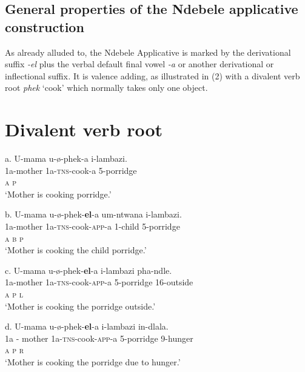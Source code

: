 \documentclass[output=paper]{langsci/langscibook}
\begin{document}
\section{ General properties of the Ndebele applicative construction}

As already alluded to, the Ndebele Applicative is marked by the derivational suffix \textit{{}-el }plus the verbal default final vowel \textit{{}-a} or another derivational or inflectional suffix\textit{.} It is valence adding, as illustrated in (2) with a divalent verb root \textit{phek} ‘cook’ which normally takes only one object. 

\chapter[Divalent verb root ]{Divalent verb root\textbf{ }}
\gll   a.  U-mama         u-ø-phek-a             i-lambazi.\\
     \textit{    }1a-mother      1a-\textsc{tns}{}-cook-a      5-porridge\\
         \textsc{a                  p}\\
\glt     ‘Mother is cooking porridge.’
\z

\gll   b.   U-mama        u-ø-phek-\textbf{el}{}-a          um-ntwana  i-lambazi. \\
     \textit{    }1a-mother      1a-\textsc{tns}{}-cook-\textsc{app}{}-a  1-child      5-porridge\\
     \textit{    }\textsc{a                  b        p}\\
\glt     ‘Mother is cooking the child porridge.’
\z

\gll   c.  U-mama      u-ø-phek-\textbf{el}{}-a              i-lambazi        pha-ndle.\\
         1a-mother   1a-\textsc{tns}{}-cook-\textsc{app}{}-a    5-porridge       16-outside\\
         \textsc{a                    p        l}\\
\glt     ‘Mother is cooking the porridge outside.’
\z

\gll   d.  U-mama          u-ø-phek-\textbf{el}{}-a               i-lambazi    in-dlala.\\
         1a - mother     1a-\textsc{tns}{}-cook-\textsc{app}{}-a     5-porridge    9-hunger\\
         \textsc{a                    p        r}\\
\glt     ‘Mother is cooking the porridge due to hunger.’
\z
\end{document}
